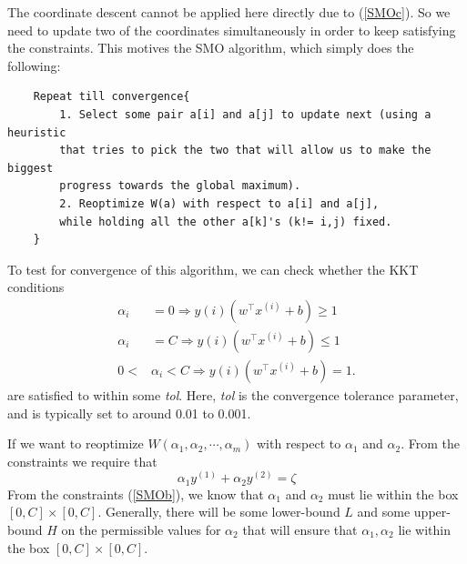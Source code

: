 \documentclass[a4paper]{book}
\begin{document}
The coordinate descent cannot be applied here directly due to (\ref{SMOc}). So we need to update two of the coordinates simultaneously in order to keep satisfying the constraints. This motives the SMO algorithm, which simply does the following:
\begin{verbatim}
    Repeat till convergence{
        1. Select some pair a[i] and a[j] to update next (using a heuristic 
        that tries to pick the two that will allow us to make the biggest 
        progress towards the global maximum).
        2. Reoptimize W(a) with respect to a[i] and a[j], 
        while holding all the other a[k]'s (k!= i,j) fixed.
    }
\end{verbatim}
To test for convergence of this algorithm, we can check whether the KKT
conditions
\begin{align}
	\alpha_i &= 0 \Rightarrow y(i)(w^{\intercal} x^{(i)} + b) \geq 1 \\
	\alpha_i &= C \Rightarrow y(i)(w^{\intercal} x^{(i)} + b) \leq 1 \\
	0 <& \alpha_i < C \Rightarrow y(i)(w^{\intercal} x^{(i)} + b) = 1.
\end{align}
 are satisfied to within some \emph{tol}. Here, \emph{tol} is
the convergence tolerance parameter, and is typically set to around 0.01 to
0.001.

If we want to reoptimize $W(\alpha_1,\alpha_2,\cdots,\alpha_m)$ with respect to $\alpha_1$ and $\alpha_2$. From the constraints we require that 
\begin{equation}
	\alpha_1 y^{(1)} + \alpha_2 y^{(2)} = \zeta
\end{equation}
From the constraints (\ref{SMOb}), we know that $\alpha_1$ and $\alpha_2$ must lie within the box $[0,C] \times [0,C]$. Generally, there will be some lower-bound $L$ and some upper-bound $H$ on the permissible values for $\alpha_2$ that will ensure that $\alpha_1,\alpha_2$ lie within the box $[0,C] \times [0,C]$.
\end{document}
